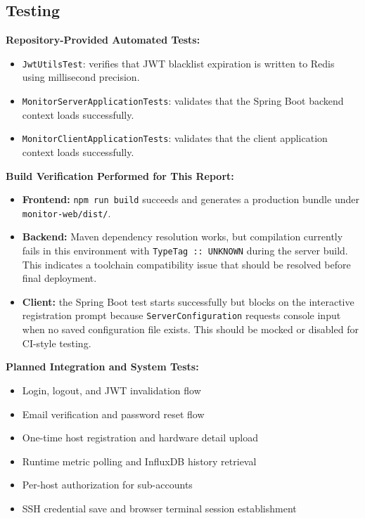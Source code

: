 \documentclass[11pt,a4paper]{article}
\begin{document}
\subsection{Testing}

\textbf{Repository-Provided Automated Tests:}
\begin{itemize}
  \item \texttt{JwtUtilsTest}: verifies that JWT blacklist expiration is written to Redis using millisecond precision.
  \item \texttt{MonitorServerApplicationTests}: validates that the Spring Boot backend context loads successfully.
  \item \texttt{MonitorClientApplicationTests}: validates that the client application context loads successfully.
\end{itemize}

\textbf{Build Verification Performed for This Report:}
\begin{itemize}
  \item \textbf{Frontend:} \texttt{npm run build} succeeds and generates a production bundle under \texttt{monitor-web/dist/}.
  \item \textbf{Backend:} Maven dependency resolution works, but compilation currently fails in this environment with \texttt{TypeTag :: UNKNOWN} during the server build. This indicates a toolchain compatibility issue that should be resolved before final deployment.
  \item \textbf{Client:} the Spring Boot test starts successfully but blocks on the interactive registration prompt because \texttt{ServerConfiguration} requests console input when no saved configuration file exists. This should be mocked or disabled for CI-style testing.
\end{itemize}

\textbf{Planned Integration and System Tests:}
\begin{itemize}
  \item Login, logout, and JWT invalidation flow
  \item Email verification and password reset flow
  \item One-time host registration and hardware detail upload
  \item Runtime metric polling and InfluxDB history retrieval
  \item Per-host authorization for sub-accounts
  \item SSH credential save and browser terminal session establishment
\end{itemize}
\end{document}
